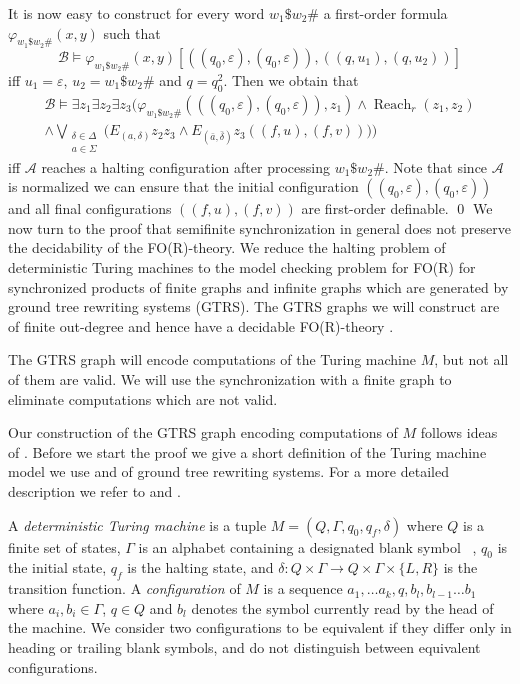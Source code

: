 \documentclass{LMCS}
\renewcommand{\phi}{\varphi}
\renewcommand{\epsilon}{\varepsilon}
\DeclareMathOperator{\Reach}{Reach}
\begin{document}
It is now easy to construct for every word $w_1\$w_2\#$ a first-order formula
$\phi_{w_1\$w_2\#}(x,y)$ such that 
\[\mathcal B \models \phi_{w_1\$w_2\#}(x,y)[((q_0,\epsilon),(q_0,\epsilon)),((q,u_1),(q,u_2))]\]
iff $u_1 = \epsilon$, $u_2 = w_1\$w_2\#$ and $q=q_0^2$.
Then we obtain that
\begin{multline*}
 \mathcal B \models \exists z_1 \exists z_2 \exists z_3 \Big( \phi_{w_1\$w_2\#}(((q_0,\epsilon),(q_0,\epsilon)),z_1)
 \wedge \Reach_r(z_1,z_2) \\ \wedge \bigvee_{\substack{\delta \in \Delta \\ a \in \Sigma}} \big( E_{(a,\delta)} z_2 z_3 
 \wedge  E_{(\bar a,\bar \delta)} z_3 ((f,u),(f,v)) \big) \Big)
\end{multline*}
iff $\mathcal A$ reaches a halting configuration after processing $w_1\$w_2\#$.
Note that since $\mathcal A$ is normalized we can ensure that the initial configuration 
$((q_0,\epsilon),(q_0,\epsilon))$
and all final configurations $((f,u),(f,v))$ are first-order definable.
\qed
We now turn to the proof that semifinite synchronization in general does not
preserve the decidability of the FO(R)-theory. We reduce the halting problem of 
deterministic Turing machines to the model checking problem for FO(R) for 
synchronized products of finite graphs and infinite graphs which are generated by  
ground tree rewriting systems (GTRS). The GTRS graphs we will construct are of finite out-degree 
and hence have a decidable FO(R)-theory \cite{loe02,loe03}.

The GTRS graph will encode computations of the Turing machine $M$, but not all
of them are valid. We will use the synchronization with a finite graph to eliminate 
computations which are not valid.

Our construction of the GTRS graph encoding computations of $M$ follows
ideas of \cite{loe03}. Before we start the proof we 
give a short definition of the Turing machine model we use and of ground 
tree rewriting systems. For a more detailed description we refer to  
\cite{hu79} and \cite{loe03}.

A \emph{deterministic Turing machine} is a tuple $M=(Q,\Gamma,q_0,q_f,\delta)$ where
$Q$ is a finite set of states, $\Gamma$ is an alphabet containing a
designated blank symbol \textvisiblespace~, $q_0$ is the initial state, $q_f$
is the halting state, and $\delta:Q \times \Gamma \rightarrow Q \times \Gamma \times
\{L,R\}$ is the transition function. A \emph{configuration} of $M$ is a sequence
$a_1, \ldots a_k, q, b_l, b_{l-1} \ldots b_1$ where $a_i,b_i \in \Gamma$, $q \in Q$
and $b_l$ denotes the symbol currently read by the head of the machine. We consider
two configurations to be equivalent if they differ only in heading or trailing blank 
symbols, and do not distinguish between equivalent configurations.
\end{document}
